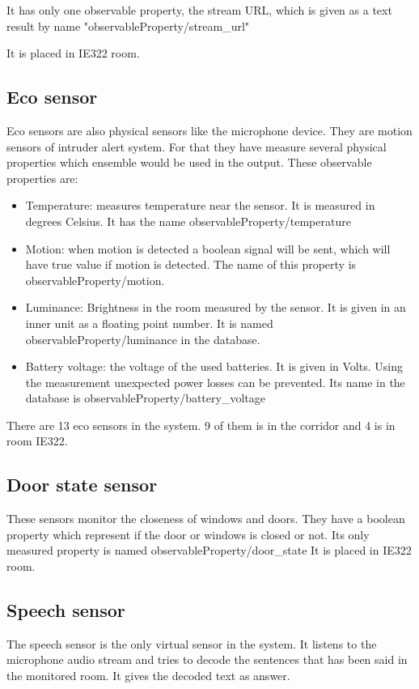  It has only one observable property, the stream URL, which is given as a text result by name "observableProperty/stream\_url"
 
 It is placed in IE322 room.
 
 \subsection*{Eco sensor}
 Eco sensors are also physical sensors like the microphone device. They are motion sensors of intruder alert system. For that they have measure several physical properties which ensemble would be used in the output. These observable properties are:
 \begin{itemize}
 \item Temperature: measures temperature near the sensor. It is measured in degrees Celsius. It has the name observableProperty/temperature
 \item Motion: when motion is detected a boolean signal will be sent, which will have true value if motion is detected. The name of this property is observableProperty/motion.
 \item Luminance: Brightness in the room measured by the sensor. It is given in an inner unit as a floating point number. It is named observableProperty/luminance in the database.
 \item Battery voltage: the voltage of the used batteries. It is given in Volts. Using the measurement unexpected power losses can be prevented. Its name in the database is observableProperty/battery\_voltage
 \end{itemize}
 There are 13 eco sensors in the system. 9 of them is in the corridor and 4 is in room IE322.  
 
 \subsection*{Door state sensor}
 These sensors monitor the closeness of windows and doors. They have a boolean property which represent if the door or windows is closed or not. Its only measured property is named observableProperty/door\_state
 It is placed in IE322 room.
 
\subsection*{Speech sensor}

The speech sensor is the only virtual sensor in the system. It listens to the microphone audio stream and tries to decode the sentences that has been said in the monitored room. It gives the decoded text as answer.

